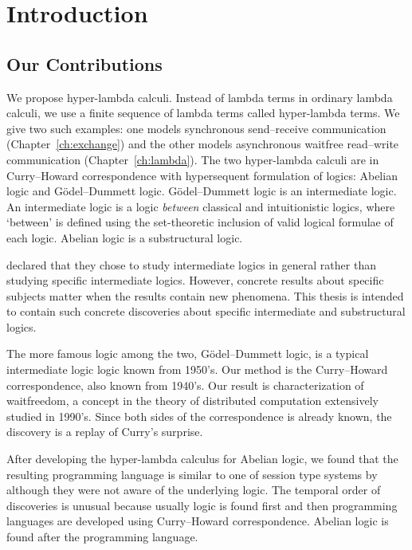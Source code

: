 \chapter{Introduction}

\section{Our Contributions}

We propose hyper-lambda calculi.
Instead of lambda terms in ordinary lambda calculi,
we use a finite sequence of lambda terms called hyper-lambda terms.
We give two such examples:
one models synchronous send--receive communication (Chapter~\ref{ch:exchange}) and
the other models asynchronous waitfree
read--write communication (Chapter~\ref{ch:lambda}).
The two hyper-lambda calculi are in Curry--Howard correspondence with
hypersequent formulation of logics: Abelian logic and G\"odel--Dummett
logic.
G\"odel--Dummett logic is an intermediate logic.
An intermediate logic is a logic \textit{between} classical and
intuitionistic logics, where `between' is defined using the
set-theoretic inclusion of valid logical formulae of each logic.
Abelian logic is a substructural logic.

\citet{hosoi-ono} declared that they chose to study intermediate
logics in
general rather than studying specific intermediate logics.
However, concrete results about specific subjects matter when the
results contain new phenomena.
This thesis is intended to contain such concrete discoveries
about specific intermediate and substructural logics.

The more famous logic among the two,
G\"odel--Dummett logic, is
a typical intermediate logic logic known from 1950's.
Our method is the Curry--Howard correspondence, also known from 1940's.
Our result is characterization of waitfreedom, a concept in the theory
of distributed computation extensively studied in 1990's.
Since both sides of the correspondence is already known,
the discovery is a replay of Curry's surprise.

After developing the hyper-lambda calculus for Abelian logic,
we found that the resulting programming language is similar to one of
session type systems by \citet{giunti2010} although they were not aware
of the underlying logic.  The temporal order of discoveries is unusual
because usually logic is found first and then programming languages are
developed using Curry--Howard correspondence.  Abelian logic is found
after the programming language.

